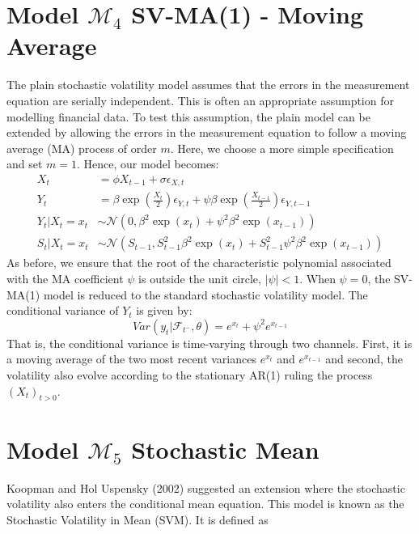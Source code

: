 \documentclass[11pt,a4,twosided,singlespacing,titlepagenumber=on]{scrreprt}
\numberwithin{equation}{chapter} %
\theoremstyle{remark}
\begin{document}
\section{Model $\mathcal{M}_4$ SV-MA(1) - Moving Average}
The plain stochastic volatility model assumes that the errors in the measurement equation are serially independent. This is often an appropriate assumption for modelling financial data. To test this assumption, the plain model can be extended by allowing the errors in the measurement equation to follow a moving average (MA) process of order $m$. Here, we choose a more simple specification and set $m = 1$. Hence, our model becomes:
\begin{align*}
X_t									&= \phi X_{t-1} + \sigma \epsilon_{X,t} \\
Y_t									&= \beta \exp \left( \frac{X_t}{2} \right) \epsilon_{Y,t} + \psi \beta \exp \left( \frac{X_{t-1}}{2} \right) \epsilon_{Y,t-1} \\
Y_t	| X_t = x_t						&\sim \mathcal{N} \left(0, \beta^2 \exp \left( x_t \right) + \psi^2 \beta^2 \exp \left( x_{t-1} \right) \right) \\
S_t | X_t = x_t						&\sim \mathcal{N} \left(S_{t-1}, S_{t-1}^2 \beta^2 \exp \left( x_t \right) +  S_{t-1}^2 \psi^2 \beta^2 \exp \left( x_{t-1} \right) \right)
\end{align*}
As before, we ensure that the root of the characteristic polynomial associated with the MA coefficient $\psi$ is outside the unit circle, $|\psi| < 1$. When $\psi = 0$, the SV-MA(1) model is reduced to the standard stochastic volatility model. The conditional
variance of $Y_t$ is given by:
$$Var \left(y_t | \mathcal{F}_{t^-}, \theta \right) = e^{x_t} + \psi^2 e^{x_{t-1}}$$
That is, the conditional variance is time-varying through two channels. First, it is a moving average of the two most recent variances $e^{x_t}$ and $e^{x_{t-1}}$ and second, the volatility also evolve according to the stationary AR(1) ruling the process $(X_t)_{t>0}$.

\section{Model $\mathcal{M}_5$ Stochastic Mean}
Koopman and Hol Uspensky (2002) suggested an extension where the stochastic volatility also enters the conditional mean equation. This model is known as the Stochastic Volatility in Mean (SVM). It is defined as
\end{document}

